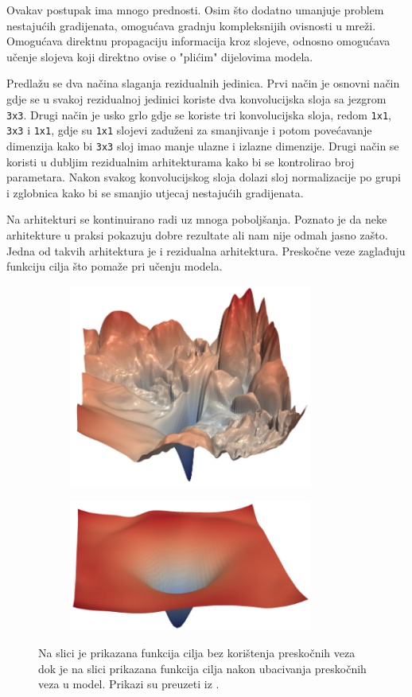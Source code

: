 \documentclass[times, utf8, diplomski,  numeric]{fer}
\begin{document}
Ovakav postupak ima mnogo prednosti. Osim što dodatno umanjuje problem nestajućih gradijenata, omogućava gradnju kompleksnijih ovisnosti u mreži. Omogućava direktnu propagaciju informacija kroz slojeve, odnosno omogućava učenje slojeva koji direktno ovise o "plićim" dijelovima modela.
\par
Predlažu se dva načina slaganja rezidualnih jedinica. Prvi način je osnovni način  gdje se u svakoj rezidualnoj jedinici koriste dva konvolucijska sloja sa jezgrom \verb|3x3|. Drugi način je usko grlo  gdje se koriste tri konvolucijska sloja, redom \verb|1x1|, \verb|3x3| i \verb|1x1|, gdje su \verb|1x1| slojevi zaduženi za smanjivanje i potom povećavanje dimenzija kako bi \verb|3x3| sloj imao manje ulazne i izlazne dimenzije. Drugi način se koristi u dubljim rezidualnim arhitekturama kako bi se kontrolirao broj parametara. Nakon svakog konvolucijskog sloja dolazi sloj normalizacije po grupi i zglobnica kako bi se smanjio utjecaj nestajućih gradijenata.
\par
Na arhitekturi se kontinuirano radi uz mnoga poboljšanja. Poznato je da neke arhitekture u praksi pokazuju dobre rezultate ali nam nije odmah jasno zašto. Jedna od takvih arhitektura je i rezidualna arhitektura. Preskočne veze zaglađuju funkciju cilja što pomaže pri učenju modela.
\begin{figure}[htb]
\begin{subfigure}[t]{.5\textwidth}
\centering
\includegraphics[width=8cm]{./images/loss-noshort}
\caption{}
\label{fig:resloss1}
\end{subfigure}
\begin{subfigure}[t]{.5\textwidth}
\centering
\includegraphics[width=8cm]{./images/loss-short}
\caption{}
\label{fig:resloss2}
\end{subfigure}
\caption{Na slici \protect{} je prikazana funkcija cilja bez korištenja preskočnih veza dok je na slici \protect{} prikazana funkcija cilja nakon ubacivanja preskočnih veza u model. Prikazi su preuzeti iz \cite{NIPS2018_7875}.}
\end{figure}
\end{document}
